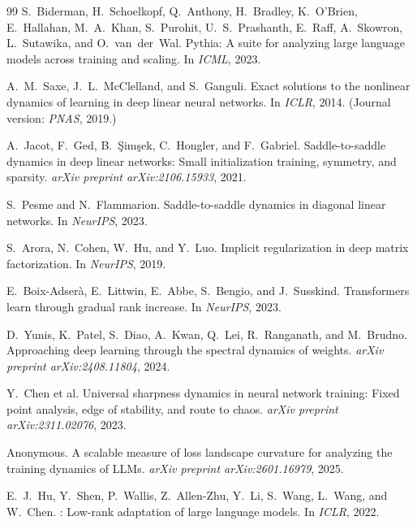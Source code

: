 \documentclass{article}
\theoremstyle{definition}
\begin{document}
\begin{thebibliography}{99}
S.~Biderman, H.~Schoelkopf, Q.~Anthony, H.~Bradley, K.~O'Brien, E.~Hallahan, M.~A.~Khan, S.~Purohit, U.~S.~Prashanth, E.~Raff, A.~Skowron, L.~Sutawika, and O.~van~der~Wal.
\newblock Pythia: A suite for analyzing large language models across training and scaling.
\newblock In \emph{ICML}, 2023.

A.~M.~Saxe, J.~L.~McClelland, and S.~Ganguli.
\newblock Exact solutions to the nonlinear dynamics of learning in deep linear neural networks.
\newblock In \emph{ICLR}, 2014. (Journal version: \emph{PNAS}, 2019.)

A.~Jacot, F.~Ged, B.~\c{S}im\c{s}ek, C.~Hongler, and F.~Gabriel.
\newblock Saddle-to-saddle dynamics in deep linear networks: Small initialization training, symmetry, and sparsity.
\newblock \emph{arXiv preprint arXiv:2106.15933}, 2021.

S.~Pesme and N.~Flammarion.
\newblock Saddle-to-saddle dynamics in diagonal linear networks.
\newblock In \emph{NeurIPS}, 2023.

S.~Arora, N.~Cohen, W.~Hu, and Y.~Luo.
\newblock Implicit regularization in deep matrix factorization.
\newblock In \emph{NeurIPS}, 2019.

E.~Boix-Adser\`a, E.~Littwin, E.~Abbe, S.~Bengio, and J.~Susskind.
\newblock Transformers learn through gradual rank increase.
\newblock In \emph{NeurIPS}, 2023.

D.~Yunis, K.~Patel, S.~Diao, A.~Kwan, Q.~Lei, R.~Ranganath, and M.~Brudno.
\newblock Approaching deep learning through the spectral dynamics of weights.
\newblock \emph{arXiv preprint arXiv:2408.11804}, 2024.

Y.~Chen et al.
\newblock Universal sharpness dynamics in neural network training: Fixed point analysis, edge of stability, and route to chaos.
\newblock \emph{arXiv preprint arXiv:2311.02076}, 2023.

Anonymous.
\newblock A scalable measure of loss landscape curvature for analyzing the training dynamics of {LLMs}.
\newblock \emph{arXiv preprint arXiv:2601.16979}, 2025.

E.~J.~Hu, Y.~Shen, P.~Wallis, Z.~Allen-Zhu, Y.~Li, S.~Wang, L.~Wang, and W.~Chen.
: Low-rank adaptation of large language models.
\newblock In \emph{ICLR}, 2022.


\end{thebibliography}
\end{document}

